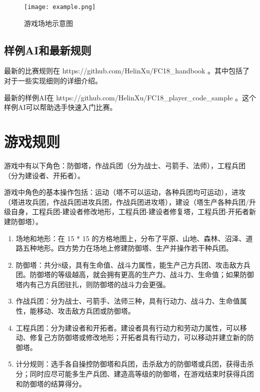 \documentclass[a4paper,4pt]{article}
\begin{document}
\begin{figure}[htbp]   %
  \centering
  \texttt{[image: example.png]}
  \caption{游戏场地示意图}
  \label{jpg:示例图片1}
\end{figure}

\subsection{样例AI和最新规则}

最新的比赛规则在 https://github.com/HelinXu/FC18\_handbook 。其中包括了对于一些实现细则的详细介绍。\par
最新的样例AI在 https://github.com/HelinXu/FC18\_player\_code\_sample 。这个样例AI可以帮助选手快速入门比赛。\par


\section{游戏规则}
游戏中有以下角色：防御塔，作战兵团（分为战士、弓箭手、法师），工程兵团（分为建设者、开拓者）。\par
游戏中角色的基本操作包括：运动（塔不可以运动，各种兵团均可运动），进攻（塔进攻兵团，作战兵团进攻兵团，作战兵团进攻塔），建设（塔生产各种兵团/升级自身，工程兵团-建设者修改地形，工程兵团-建设者修复塔，工程兵团-开拓者新建防御塔）。
\begin{enumerate}[fullwidth, itemindent=2em, label=(\arabic*)]
  \item 场地和地形：在 15 * 15 的方格地图上，分布了平原、山地、森林、沼泽、道路五种地形。四方势力在场地上修建防御塔、生产并操作若干种兵团。
  \item 防御塔：共分8级，具有生命值、战斗力属性，能生产己方兵团、攻击敌方兵团。防御塔的等级越高，就会拥有更高的生产力、战斗力、生命值；如果防御塔内有己方兵团驻扎，则防御塔的战斗力会更强。
  \item 作战兵团：分为战士、弓箭手、法师三种，具有行动力、战斗力、生命值属性，能移动、攻击敌方兵团或防御塔。
  \item 工程兵团：分为建设者和开拓者。建设者具有行动力和劳动力属性，可以移动、修复己方防御塔或修改地形；开拓者具有行动力，可以移动并建立新的防御塔。
  \item 计分规则：选手各自操控防御塔和兵团，击杀敌方的防御塔或兵团，获得击杀分；同时应尽可能多生产兵团、建造高等级的防御塔，在游戏结束时获得兵团和防御塔的结算得分。
\end{enumerate}
\par
\end{document}
